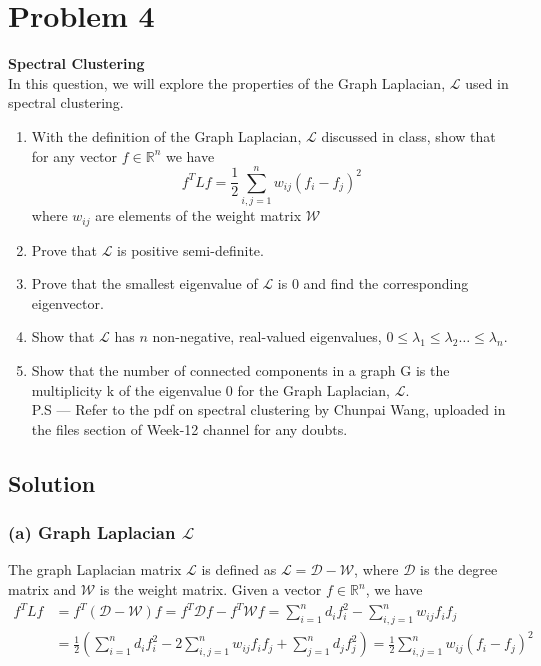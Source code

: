 \section*{Problem 4}

\textbf{Spectral Clustering}\\
In this question, we will explore the properties of the Graph Laplacian, \( \mathcal{L} \) used in spectral clustering.

\begin{enumerate}[label= (\alph*), noitemsep, topsep=0pt]
    \item With the definition of the Graph Laplacian, \( \mathcal{L} \) discussed in class, show that for any vector \( f \in \mathbb{R}^{n} \) we have
          \[
              f^{T} L f=\frac{1}{2} \sum_{i, j=1}^{n} w_{i j}\left(f_{i}-f_{j}\right)^{2}
          \]
          where \( w_{i j} \) are elements of the weight matrix \( \mathcal{W} \)

    \item Prove that \( \mathcal{L} \) is positive semi-definite.

    \item Prove that the smallest eigenvalue of \( \mathcal{L} \) is 0 and find the corresponding eigenvector.

    \item Show that \( \mathcal{L} \) has \( n \) non-negative, real-valued eigenvalues, \( 0 \leq \lambda_{1} \leq \lambda_{2} \ldots \leq \lambda_{n} \).

    \item Show that the number of connected components in a graph G is the multiplicity k of the eigenvalue 0 for the Graph Laplacian, \( \mathcal{L} \).\\
          P.S --- Refer to the pdf on spectral clustering by Chunpai Wang, uploaded in the files section of Week-12 channel for any doubts.
\end{enumerate}

\subsection*{Solution}

\subsubsection*{(a) Graph Laplacian \( \mathcal{L} \)}

The graph Laplacian matrix \( \mathcal{L} \) is defined as \( \mathcal{L} = \mathcal{D} - \mathcal{W} \), where \( \mathcal{D} \) is the degree matrix and \( \mathcal{W} \) is the weight matrix.
Given a vector \( f \in \mathbb{R}^{n} \), we have
\begin{align*}
    f^{T} L f
     & =
    f^{T} (\mathcal{D} - \mathcal{W}) f
    = f^{T} \mathcal{D} f - f^{T} \mathcal{W} f
    =
    \sum_{i=1}^{n} d_{i} f_{i}^{2} - \sum_{i, j=1}^{n} w_{i j} f_{i} f_{j}
    \\ & =
    \frac{1}{2} \left( \sum_{i=1}^{n} d_{i} f_{i}^{2} - 2 \sum_{i, j=1}^{n} w_{i j} f_{i} f_{j} + \sum_{j=1}^{n} d_{j} f_{j}^{2} \right)
    =
    \frac{1}{2} \sum_{i, j=1}^{n} w_{i j} (f_{i} - f_{j})^{2}
\end{align*}


